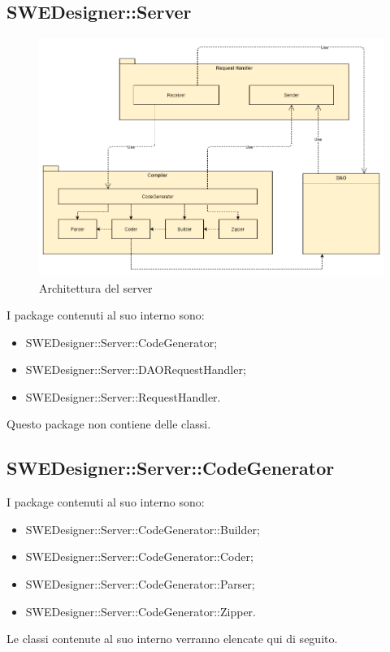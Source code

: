 \documentclass[../SpecificaTecnica.tex]{subfiles}
\begin{document}
			\subsection{SWEDesigner::Server}
			\begin{figure}[H]\label{fig:ServerSubsystem}
				\centering
				\includegraphics[scale=0.4]{Immagini/DiagrammaArchitettura/ServerSubsystem.png}
				\caption{Architettura del server}
			\end{figure}
			I package contenuti al suo interno sono:
			\begin{itemize}
				\item SWEDesigner::Server::CodeGenerator;
				\item SWEDesigner::Server::DAORequestHandler;
				\item SWEDesigner::Server::RequestHandler.
			\end{itemize}
			Questo package non contiene delle classi.
			
			\subsection{SWEDesigner::Server::CodeGenerator}
			I package contenuti al suo interno sono:
			\begin{itemize}
				\item SWEDesigner::Server::CodeGenerator::Builder;
				\item SWEDesigner::Server::CodeGenerator::Coder;
				\item SWEDesigner::Server::CodeGenerator::Parser;
				\item SWEDesigner::Server::CodeGenerator::Zipper.
			\end{itemize}
			Le classi contenute al suo interno verranno elencate qui di seguito.
			
\end{document}
